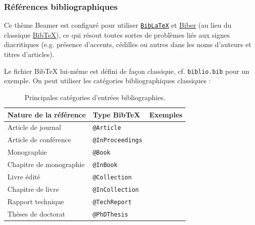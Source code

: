 \documentclass[10pt,    %
    french,             %
    xcolor=table,       %
    envcountsect        %
]{beamer}
\begin{document}
\begin{frame}
    \frametitle{Références bibliographiques}
    
    Ce thème Beamer est configuré pour utiliser \href{https://ctan.org/pkg/biblatex?lang=en}{\texttt{BibLaTeX}} et \href{http://biblatex-biber.sourceforge.net/}{Biber} (au lieu du classique \href{http://www.bibtex.org/}{BibTeX}), ce qui résout toutes sortes de problèmes liés aux signes diacritiques (e.g. présence d'accents, cédilles ou autres dans les noms d'auteurs et titres d'articles).
    
    \vspace{0.25cm}
    Le fichier BibTeX lui-même est défini de façon classique, cf. \texttt{biblio.bib} pour un exemple. On peut utiliser les catégories bibliographiques classiques :
    
    \begin{table}[H]
        \small
        \centering
        \begin{tabular}{l l r}
            \hline
	        \rowcolor{fgLightRed} 
            \textbf{Nature de la référence} & \textbf{Type BibTeX} & \textbf{Exemples}\\
            \hline
            Article de journal & \texttt{@Article} & \cite{Fortunato2010, Cossu2016} \\
            Article de conférence & \texttt{@InProceedings} & \cite{Wei1989, Mauttone2008} \\
            Monographie & \texttt{@Book} & \cite{Wolsey1998, Masuda2016} \\
            Chapitre de monographie & \texttt{@InBook} & \cite{Mainzer2007a, Reichardt2009a} \\
            Livre édité & \texttt{@Collection} & \cite{Pastor-Satorras2003a, Brandes2005} \\
            Chapitre de livre & \texttt{@InCollection} & \cite{Danon2007, Labatut2012a} \\
            Rapport technique & \texttt{@TechReport} & \cite{Rosvall2009a, Paraskevopoulos2013} \\
            Thèses de doctorat & \texttt{@PhDThesis} & \cite{Wong1978, Gerbaud2010} \\
            \hline
        \end{tabular}
        \caption{Principales catégories d'entrées bibliographies.}
        \label{tab:bibtex}
    \end{table}
\end{frame}
\end{document}
